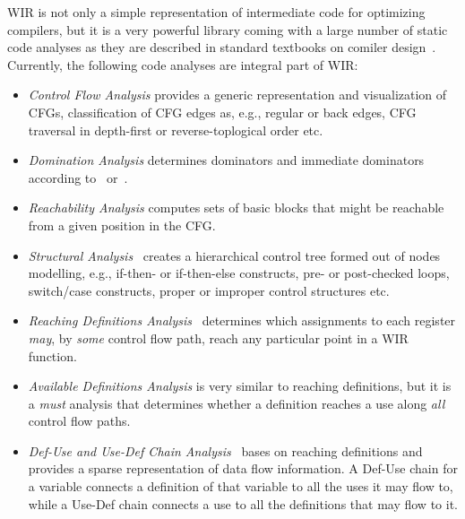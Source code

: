 \gls{WIR} is not only a simple representation of intermediate code for optimizing compilers, but it is a very powerful library coming with a large number of static code analyses as they are described in standard textbooks on comiler design~\cite{Appel04,Much97}.
Currently, the following code analyses are integral part of \gls{WIR}:
\begin{itemize}
  \item \textit{Control Flow Analysis} provides a generic representation and visualization of \glspl{CFG}, classification of \gls{CFG} edges as, e.g., regular or back edges, \gls{CFG} traversal in depth-first or reverse-toplogical order etc.

  \item \textit{Domination Analysis} determines dominators and immediate dominators according to~\cite[chapter~18.1]{Appel04} or~\cite[chapter~7.3]{Much97}.

  \item \textit{Reachability Analysis} computes sets of basic blocks that might be reachable from a given position in the \gls{CFG}.

  \item \textit{Structural Analysis}~\cite[chapter 7.7]{Much97} creates a hierarchical control tree formed out of nodes modelling, e.g., if-then- or if-then-else constructs, pre- or post-checked loops, switch/case constructs, proper or improper control structures etc.

  \item \textit{Reaching Definitions Analysis}~\cite[chapter~17.2]{Appel04}\cite[chapter~8.1]{Much97} determines which assignments to each register \textit{may}, by \textit{some} control flow path, reach any particular point in a \gls{WIR} function.

  \item \textit{Available Definitions Analysis} is very similar to reaching definitions, but it is a \textit{must} analysis that determines whether a definition reaches a use along \textit{all} control flow paths.

  \item \textit{Def-Use and Use-Def Chain Analysis}~\cite[chapter~17.4]{Appel04}\cite[chapter~8.10]{Much97} bases on reaching definitions and provides a sparse representation of data flow information.
  A Def-Use chain for a variable connects a definition of that variable to all the uses it may flow to, while a Use-Def chain connects a use to all the definitions that may flow to it.


\end{itemize}
